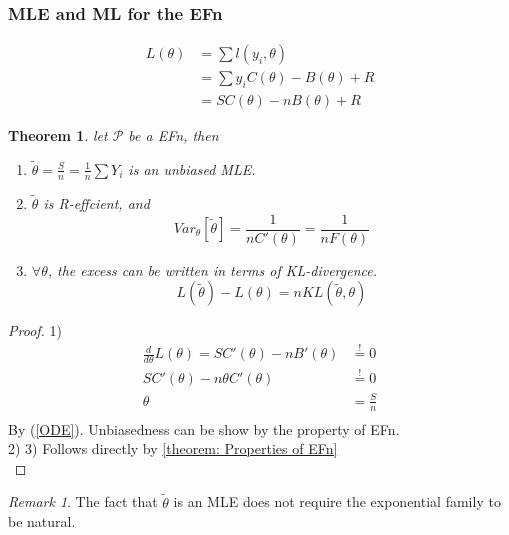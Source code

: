 \documentclass[a4paper,12pt, oneside, fleqn]{book}
\newtheorem{theorem}{Theorem}[section]
\theoremstyle{definition}
\theoremstyle{remark}
\newtheorem*{remark}{Remark}
\begin{document}
\subsubsection*{MLE and ML for the EFn}

\begin{align*}
	L(\theta) &= \sum l(y_i, \theta)\\
	&= \sum y_iC(\theta) - B(\theta) + R\\
	&= S C(\theta) - n B(\theta) + R
\end{align*}

\begin{theorem}
	let $\mathcal{P}$ be a EFn, then
	\begin{enumerate}
		\item $\tilde{\theta} = \frac{S}{n} = \frac{1}{n} \sum Y_i$ is an unbiased MLE.
		\item $\tilde{\theta}$ is R-effcient, and 
			\begin{equation*}
				Var_\theta[\tilde{\theta}] = \frac{1}{nC'(\theta)} = \frac{1}{n F(\theta)}
			\end{equation*}
		\item $\forall \theta$, the excess can be written in terms of KL-divergence.
			\begin{equation*}
				L(\tilde{\theta}) - L(\theta) = n KL(\tilde{\theta}, \theta)
			\end{equation*}
	\end{enumerate}
\end{theorem}
	
\begin{proof}
1)\\
\begin{equation*}
	\begin{aligned}
		\frac{d}{d\theta}L(\theta) = S C'(\theta) - n B'(\theta) &\overset{!}{=} 0\\
		SC'(\theta) - n \theta C'(\theta) &\overset{!}{=} 0\\
		\theta &= \frac{S}{n}\\
	\end{aligned}
\end{equation*}
By (\ref{ODE}).  Unbiasedness can be show by the property of EFn.\\
2) 3) Follows directly by \ref{theorem: Properties of EFn} \\
\end{proof}

\begin{remark} The fact that $\tilde{\theta}$ is an MLE does not require the exponential family to be natural. 
\end{remark}
\end{document}
